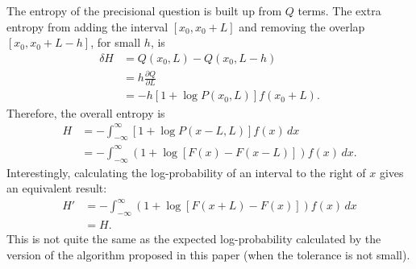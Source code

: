 \documentclass[entropy,article,accept,oneauthor,pdftex,10pt,a4paper]{mdpi}
\begin{document}
The entropy of the precisional question is built up from
$Q$ terms. The extra entropy from adding the interval
$[x_0, x_0 + L]$ and removing the overlap $[x_0, x_0 + L - h]$, for small $h$, is
\begin{align}
\delta H &= Q(x_0, L) - Q(x_0, L - h)\\
         &= h\frac{\partial Q}{\partial L} \\
         &= -h\left[1 + \log P(x_0, L)\right]f(x_0 + L).
\end{align}
Therefore, the overall entropy is
\begin{align}
H &= -\int_{-\infty}^\infty
        \left[1 + \log P(x-L, L)\right]f(x)
      \, dx \\
  &= -\int_{-\infty}^\infty
        \left(1 + \log\left[F(x) - F(x-L)\right]\right)f(x)
      \, dx.
\end{align}
Interestingly, calculating the log-probability of an interval
to the right of $x$ gives an equivalent result:
\begin{align}
H' &=  -\int_{-\infty}^\infty
        \left(1 + \log\left[F(x+L) - F(x)\right]\right)f(x)
      \, dx \\
   &= H.
\end{align}
This is not quite the same as the expected log-probability calculated by
the version of the algorithm proposed in this paper (when the tolerance is not
small).


%

\end{document}
